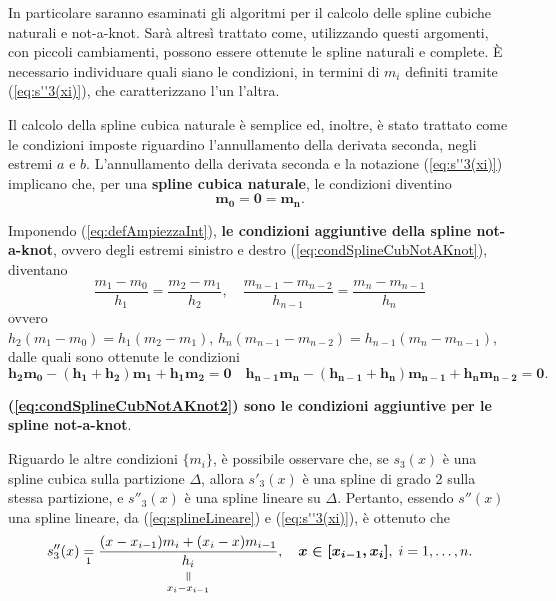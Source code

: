 In particolare saranno esaminati gli algoritmi per il calcolo delle spline cubiche naturali e not-a-knot. Sarà altresì trattato come, utilizzando questi argomenti, con piccoli cambiamenti, possono essere ottenute le spline naturali e complete. È necessario individuare quali siano le condizioni, in termini di $m_i$ definiti tramite (\ref{eq:s''3(xi)}), che caratterizzano l'un l'altra.

Il calcolo della spline cubica naturale è semplice ed, inoltre, è stato trattato come le condizioni imposte riguardino l'annullamento della derivata seconda, negli estremi $a$ e $b$. L'annullamento della derivata seconda e la notazione (\ref{eq:s''3(xi)}) implicano che, per una \textbf{spline cubica naturale}, le condizioni diventino
\begin{equation}\label{eq:condSplineNat}
    \boldsymbol{m_0=0=m_n}.
\end{equation}

Imponendo (\ref{eq:defAmpiezzaInt}), \textbf{le condizioni aggiuntive della spline not-a-knot}, ovvero degli estremi sinistro e destro (\ref{eq:condSplineCubNotAKnot}), diventano
\begin{equation*}
    \frac{m_1-m_0}{h_1}=\frac{m_2-m_1}{h_2},\quad \frac{m_{n-1}-m_{n-2}}{h_{n-1}}=\frac{m_n-m_{n-1}}{h_n}
\end{equation*}
ovvero $h_2(m_1-m_0)=h_1(m_2-m_1),\, h_{n}(m_{n-1}-m_{n-2})=h_{n-1}(m_{n}-m_{n-1})$, dalle quali sono ottenute le condizioni
\begin{equation}\label{eq:condSplineCubNotAKnot2}
    \boldsymbol{h_2m_0-(h_1+h_2)m_1+h_1m_2=0}\quad\boldsymbol{h_{n-1}m_n-(h_{n-1}+h_n)m_{n-1}+h_nm_{n-2}=0}.
\end{equation}

\textbf{(\ref{eq:condSplineCubNotAKnot2}) sono le condizioni aggiuntive per le spline not-a-knot}.

Riguardo le altre condizioni $\{m_i\}$, è possibile osservare che, se $s_3(x)$ è una spline cubica sulla partizione $\Delta$, allora $s'_3(x)$ è una spline di grado 2 sulla stessa partizione, e $s''_3(x)$ è una spline lineare su $\Delta$. Pertanto, essendo $s''(x)$ una spline lineare, da (\ref{eq:splineLineare}) e (\ref{eq:s''3(xi)}), è ottenuto che
\begin{equation*}
    s''_3(x)\underset{\footnotemark}{=}\frac{(x-x_{i-1})m_i+(x_i-x)m_{i-1}}{\equalto{h_i}{x_i-x_{i-1}}},\quad\boldsymbol{x\in[x_{i-1}, x_i]},\; i=1,\hdots,n.
\end{equation*}

